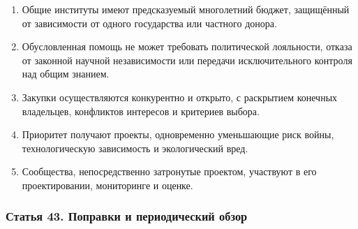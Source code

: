 \documentclass[
  russian,
  11pt,
  a4paper,
]{article}
\providecommand{\tightlist}{%
  \setlength{\itemsep}{0pt}\setlength{\parskip}{0pt}}
\begin{document}
\begin{enumerate}
\def\labelenumi{\arabic{enumi}.}
\tightlist
\item
  Общие институты имеют предсказуемый многолетний бюджет, защищённый от
  зависимости от одного государства или частного донора.
\item
  Обусловленная помощь не может требовать политической лояльности,
  отказа от законной научной независимости или передачи исключительного
  контроля над общим знанием.
\item
  Закупки осуществляются конкурентно и открыто, с раскрытием конечных
  владельцев, конфликтов интересов и критериев выбора.
\item
  Приоритет получают проекты, одновременно уменьшающие риск войны,
  технологическую зависимость и экологический вред.
\item
  Сообщества, непосредственно затронутые проектом, участвуют в его
  проектировании, мониторинге и оценке.
\end{enumerate}

\subsubsection{Статья 43. Поправки и периодический
обзор}\label{ux441ux442ux430ux442ux44cux44f-43-ux43fux43eux43fux440ux430ux432ux43aux438-ux438-ux43fux435ux440ux438ux43eux434ux438ux447ux435ux441ux43aux438ux439-ux43eux431ux437ux43eux440}
\end{document}
